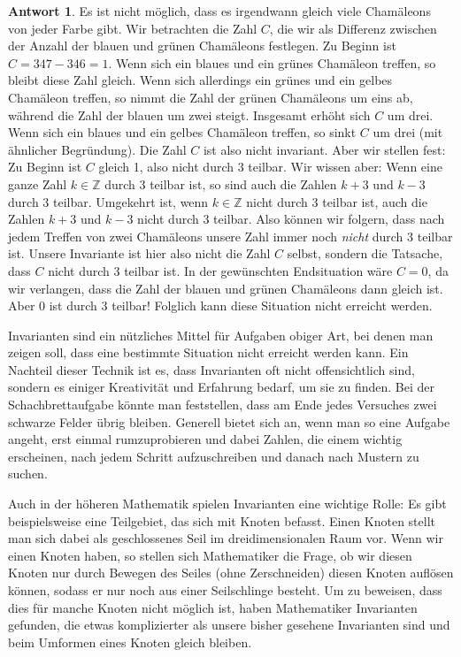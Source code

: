 \documentclass[a4paper,ngerman,12pt]{scrartcl}
\newcommand{\Z}{\mathbb{Z}}
\theoremstyle{definition}
\newtheorem*{antw}{Antwort}
\begin{document}
\begin{antw}
  Es ist nicht möglich, dass es irgendwann gleich viele Chamäleons von jeder Farbe gibt. Wir betrachten die Zahl $C$, die wir als Differenz zwischen der Anzahl der blauen und grünen Chamäleons festlegen. Zu Beginn ist $C = 347 - 346 = 1$. Wenn sich ein blaues und ein grünes Chamäleon treffen, so bleibt diese Zahl gleich. Wenn sich allerdings ein grünes und ein gelbes Chamäleon treffen, so nimmt die Zahl der grünen Chamäleons um eins ab, während die Zahl der blauen um zwei steigt. Insgesamt erhöht sich $C$ um drei. Wenn sich ein blaues und ein gelbes Chamäleon treffen, so sinkt $C$ um drei (mit ähnlicher Begründung). Die Zahl $C$ ist also nicht invariant. Aber wir stellen fest: Zu Beginn ist $C$ gleich 1, also nicht durch 3 teilbar. Wir wissen aber: Wenn eine ganze Zahl $k \in \Z$ durch 3 teilbar ist, so sind auch die Zahlen $k + 3$ und $k - 3$ durch 3 teilbar. Umgekehrt ist, wenn $k \in \Z$ nicht durch 3 teilbar ist, auch die Zahlen $k + 3$ und $k - 3$ nicht durch 3 teilbar. Also können wir folgern, dass nach jedem Treffen von zwei Chamäleons unsere Zahl immer noch \emph{nicht} durch 3 teilbar ist. Unsere Invariante ist hier also nicht die Zahl $C$ selbst, sondern die Tatsache, dass $C$ nicht durch 3 teilbar ist. In der gewünschten Endsituation wäre $C = 0$, da wir verlangen, dass die Zahl der blauen und grünen Chamäleons dann gleich ist. Aber 0 ist durch 3 teilbar! Folglich kann diese Situation nicht erreicht werden.
\end{antw}

Invarianten sind ein nützliches Mittel für Aufgaben obiger Art, bei denen man zeigen soll, dass eine bestimmte Situation nicht erreicht werden kann. Ein Nachteil dieser Technik ist es, dass Invarianten oft nicht offensichtlich sind, sondern es einiger Kreativität und Erfahrung bedarf, um sie zu finden. Bei der Schachbrettaufgabe könnte man feststellen, dass am Ende jedes Versuches zwei schwarze Felder übrig bleiben. Generell bietet sich an, wenn man so eine Aufgabe angeht, erst einmal rumzuprobieren und dabei Zahlen, die einem wichtig erscheinen, nach jedem Schritt aufzuschreiben und danach nach Mustern zu suchen.

Auch in der höheren Mathematik spielen Invarianten eine wichtige Rolle: Es gibt beispielsweise eine Teilgebiet, das sich mit Knoten befasst. Einen Knoten stellt man sich dabei als geschlossenes Seil im dreidimensionalen Raum vor. Wenn wir einen Knoten haben, so stellen sich Mathematiker die Frage, ob wir diesen Knoten nur durch Bewegen des Seiles (ohne Zerschneiden) diesen Knoten auflösen können, sodass er nur noch aus einer Seilschlinge besteht. Um zu beweisen, dass dies für manche Knoten nicht möglich ist, haben Mathematiker Invarianten gefunden, die etwas komplizierter als unsere bisher gesehene Invarianten sind und beim Umformen eines Knoten gleich bleiben.
\end{document}
